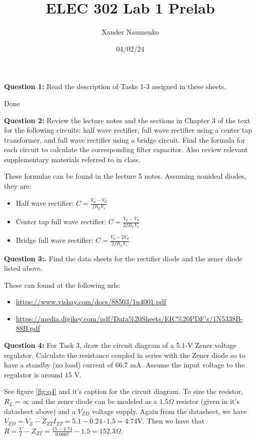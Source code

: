 \documentclass[letterpaper, reqno,11pt]{article}
\begin{document}
\title{ELEC 302 Lab 1 Prelab}
\date{04/02/24}
\author{Xander Naumenko}
\maketitle

{\medskip\noindent\bf Question 1: } Read the description of Tasks 1-3 assigned in these sheets.

Done

{\medskip\noindent\bf Question 2:} Review the lecture notes and the sections in Chapter 3 of the text for the following circuits: half wave rectifier, full wave rectifier using a center tap transformer, and full wave rectifier using a bridge circuit. Find the formula for each circuit to calculate the corresponding filter capacitor. Also review relevant supplementary materials referred to in class.

These formulae can be found in the lecture 5 notes. Assuming nonideal diodes, they are:
\begin{itemize}
    \item {Half wave rectifier: $C=\frac{V_p-V_d}{fR_LV_r}$}
    \item {Center tap full wave rectifier: $C=\frac{V_p-V_d}{2fR_LV_r}$}
    \item {Bridge full wave rectifier: $C=\frac{V_p-2V_d}{2fR_LV_r}$}
\end{itemize}

{\medskip\noindent\bf Question 3:.} Find the data sheets for the rectifier diode and the zener diode listed above.

These can found at the following urls:
\begin{itemize}
    \item{\href{https://www.vishay.com/docs/88503/1n4001.pdf}{https://www.vishay.com/docs/88503/1n4001.pdf}}
    \item{\href{https://media.digikey.com/pdf/Data%20Sheets/EIC%20PDF's/1N5338B-88B.pdf}{https://media.digikey.com/pdf/Data\%20Sheets/EIC\%20PDF's/1N5338B-88B.pdf}}
\end{itemize}

{\medskip\noindent\bf Question 4:} For Task 3, draw the circuit diagram of a 5.1-V Zener voltage regulator. Calculate the resistance coupled in series with the Zener diode so to have a standby (no load) current of 66.7 mA. Assume the input voltage to the regulator is around 15 V.

See figure \ref{fig:q4} and it's caption for the circuit diagram. To size the resistor, $R_L=\infty$ and the zener diode can be modeled as a $1.5\Omega$ resistor (given in it's datasheet above) and a $V_{ZD}$ voltage supply. Again from the datasheet, we have $V_{ZD}=V_Z-Z_{ZT}I_{ZT}=5.1-0.24\cdot 1.5=4.74\text{V}$. Then we have that $R=\frac{V}{I}-Z_{ZT}=\frac{15-4.74}{0.0667}-1.5=152.3\Omega$.
\end{document}
